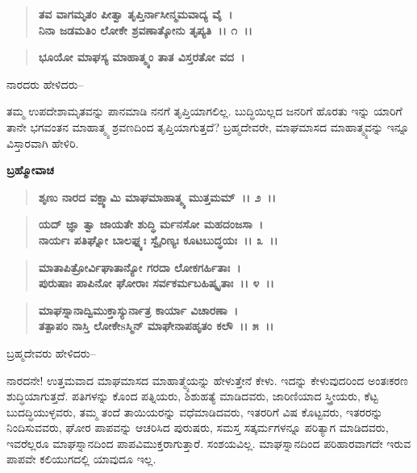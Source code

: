 \begin{verse}
\textbf{ತವ ವಾಗಮೃತಂ ಪೀತ್ವಾ ತೃಪ್ತಿರ್ನಾಸೀನ್ಮಮವಾದ್ಯ ವೈ~।}\\\textbf{ನಿನಾ ಜಡಮತಿಂ ಲೋಕೇ ಶ್ರವಣಾತ್ಕೋನು ತೃಪ್ಯತಿ~।। ೧~।।}
\end{verse}

\begin{verse}
\textbf{ಭೂಯೋ ಮಾಘಸ್ಯ ಮಾಹಾತ್ಮ್ಯಂ ತಾತ ವಿಸ್ತರತೋ ವದ~।}
\end{verse}

\begin{flushleft}
ನಾರದರು ಹೇಳಿದರು–
\end{flushleft}

ತಮ್ಮ ಉಪದೇಶಾಮೃತವನ್ನು ಪಾನಮಾಡಿ ನನಗೆ ತೃಪ್ತಿಯಾಗಲಿಲ್ಲ. ಬುದ್ಧಿಯಿಲ್ಲದ ಜನರಿಗೆ ಹೊರತು ಇನ್ನು ಯಾರಿಗೆ ತಾನೇ ಭಗವಂತನ ಮಾಹಾತ್ಮ್ಯ ಶ್ರವಣದಿಂದ ತೃಪ್ತಿಯಾಗುತ್ತದೆ? ಬ್ರಹ್ಮದೇವರೇ, ಮಾಘಮಾಸದ ಮಾಹಾತ್ಮ್ಯವನ್ನು ಇನ್ನೂ ವಿಸ್ತಾರವಾಗಿ ಹೇಳಿರಿ.

\begin{flushleft}
\textbf{ಬ್ರಹ್ಮೋವಾಚ}
\end{flushleft}

\begin{verse}
\textbf{ಶೃಣು ನಾರದ ವಕ್ಷ್ಯಾಮಿ ಮಾಘಮಾಹಾತ್ಮ್ಯ ಮುತ್ತಮಮ್~।। ೨~।। }
\end{verse}

\begin{verse}
\textbf{ಯದ್ ಜ್ಞಾ ತ್ವಾ ಜಾಯತೇ ಶುದ್ಧಿ ರ್ಮನಸೋ ಮಹದಂಜಸಾ~।}\\\textbf{ನಾರ್ಯಃ ಪತಿಘ್ನೋ ಬಾಲಘ್ನ್ಯಃ ಸ್ವೈರಿಣ್ಯಃ ಕೂಟಬುದ್ಧಯಃ~।। ೩~।। }
\end{verse}

\begin{verse}
\textbf{ಮಾತಾಪಿತ್ರೋರ್ವಿಘಾತಾನ್ಯೋ ಗರದಾ ಲೋಕಗರ್ಹಿತಾಃ~।}\\\textbf{ಪುರುಷಾಃ ಪಾಪಿನೋ ಘೋರಾಃ ಸರ್ವಕರ್ಮಬಹಿಷ್ಕೃತಾಃ~।। ೪~।। }
\end{verse}

\begin{verse}
\textbf{ಮಾಘಸ್ನಾನಾದ್ವಿಮುಕ್ತಾಸ್ಯುರ್ನಾತ್ರ ಕಾರ್ಯಾ ವಿಚಾರಣಾ~।}\\\textbf{ತತ್ಪಾಪಂ ನಾಸ್ತಿ ಲೋಕೇsಸ್ಮಿನ್ ಮಾಘೇನಾಪಹೃತಂ ಕಲೌ~।। ೫~।।}
\end{verse}

\begin{flushleft}
ಬ್ರಹ್ಮದೇವರು ಹೇಳಿದರು–
\end{flushleft}

ನಾರದನೇ! ಉತ್ತಮವಾದ ಮಾಘಮಾಸದ ಮಾಹಾತ್ಮ್ಯೆಯನ್ನು ಹೇಳುತ್ತೇನೆ ಕೇಳು. ಇದನ್ನು ಕೇಳುವುದರಿಂದ ಅಂತಃಕರಣ ಶುದ್ಧಿಯಾಗುತ್ತದೆ. ಪತಿಗಳನ್ನು ಕೊಂದ ಪತ್ನಿಯರು, ಶಿಶುಹತ್ಯೆ ಮಾಡಿದವರು, ಜಾರಿಣಿಯಾದ ಸ್ತ್ರೀಯರು, ಕೆಟ್ಟ ಬುದದ್ಧಿಯುಳ್ಳವರು, ತಮ್ಮ ತಂದೆ ತಾಯಿಯರನ್ನು ವಧೆಮಾಡಿದವರು, ಇತರರಿಗೆ ವಿಷ ಕೊಟ್ಟವರು, ಇತರರನ್ನು ನಿಂದಿಸುವವರು, ಘೋರ ಪಾಪವನ್ನು ಆಚರಿಸಿದ ಪುರುಷರು, ಸಮಸ್ತ ಸತ್ಕರ್ಮಗಳನ್ನೂ ಪರಿತ್ಯಾಗ ಮಾಡಿದವರು, ಇವರೆಲ್ಲರೂ ಮಾಘಸ್ನಾನದಿಂದ ಪಾಪವಿಮುಕ್ತರಾಗುತ್ತಾರೆ. ಸಂಶಯವಿಲ್ಲ. ಮಾಘಸ್ನಾನದಿಂದ ಪರಿಹಾರವಾಗದೇ ಇರುವ ಪಾಪವೇ ಕಲಿಯುಗದಲ್ಲಿ ಯಾವುದೂ ಇಲ್ಲ.

